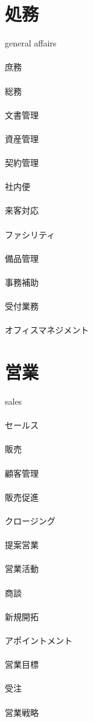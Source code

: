 \section*{処務}
general affairs
\\\\
庶務
\\\\
総務
\\\\
文書管理
\\\\
資産管理
\\\\
契約管理
\\\\
社内便
\\\\
来客対応
\\\\
ファシリティ
\\\\
備品管理
\\\\
事務補助
\\\\
受付業務
\\\\
オフィスマネジメント

\section*{営業}
sales
\\\\
セールス
\\\\
販売
\\\\
顧客管理
\\\\
販売促進
\\\\
クロージング
\\\\
提案営業
\\\\
営業活動
\\\\
商談
\\\\
新規開拓
\\\\
アポイントメント
\\\\
営業目標
\\\\
受注
\\\\
営業戦略

